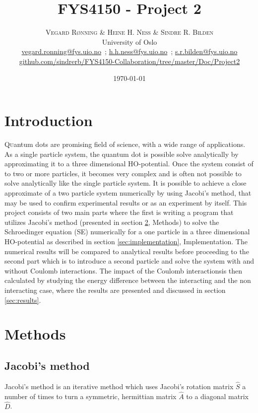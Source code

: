 \documentclass[twoside,twocolumn]{article}
\title{FYS4150 - Project 2} %
\author{%
	\textsc{Vegard R\o{}nning \& Heine H. Ness \& Sindre R. Bilden} \\[1ex] %
	\normalsize University of Oslo \\ %
	\normalsize \href{mailto:vegard.ronning@fys.uio.no}{vegard.ronning@fys.uio.no}\ ; \href{mailto:h.h.ness@fys.uio.no}{h.h.ness@fys.uio.no}\ ; \href{mailto:s.r.bilden@fys.uio.no}{s.r.bilden@fys.uio.no}\\%
	\footnotesize \href{https://github.com/sindrerb/FYS4150-Collaboration/tree/master/Doc/Project2}{github.com/sindrerb/FYS4150-Collaboration/tree/master/Doc/Project2}
}
\date{\today} %
\newcommand{\SE}{Schroedinger equation }
\newcommand{\CI}{Coulomb interactions}
\begin{document}
	
	\maketitle
	
\vspace{-2cm}
	\section{Introduction}\vspace{-0.4cm}
	\lettrine[nindent=0em,lines=2]{Q}uantum dots are promising field of science, with a wide range of applications. As a single particle system, the quantum dot is possible solve analytically by approximating it to a three dimensional HO-potential. Once the system consist of to two or more particles, it becomes very complex and is often not possible to solve analytically like the single particle system. It is possible to achieve a close approximate of a two particle system numerically by using Jacobi's method, that may be used to confirm experimental results or as an experiment by itself. This project consists of two main parts where the first is writing a program that utilizes Jacobi's method (presented in section \ref{sec:methods}, Methods) to solve the \SE (SE) numerically for a one particle in a three dimensional HO-potential as described in section \ref{sec:implementation}, Implementation. The numerical results will be compared to analytical results before proceeding to the second part which is to introduce a second particle and solve the system with and without \CI. The impact of the \CI is then calculated by studying the energy difference between the interacting and the non interacting case, where the results are presented and discussed in section \ref{sec:results}.
	\section{Methods}
	\label{sec:methods}
	\subsection{Jacobi's method}
	Jacobi's method is an iterative method which uses Jacobi's rotation matrix $\hat{S}$ a number of times to turn a symmetric, hermittian matrix $\hat{A}$ to a diagonal matrix $\hat{D}$.
	
\end{document}

